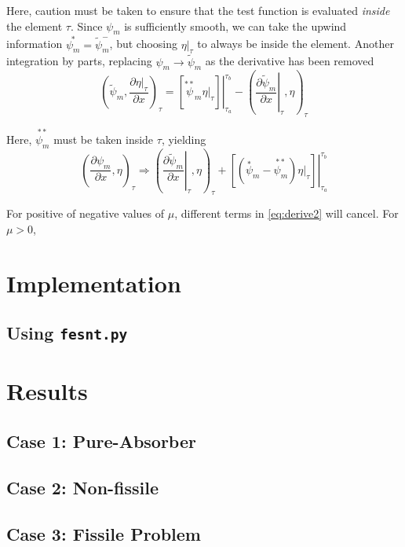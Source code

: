 \documentclass{article}
\newcommand{\pdiff}[2]{\frac{\partial#1}{\partial#2}}
\newcommand{\ddx}[1]{\pdiff{#1}{x}}
\newcommand{\dpmdx}{\ddx{\psi_m}}
\newcommand{\fepsim}{\tilde{\psi}_m}
\newcommand{\innerProd}[2]{\left(#1,#2\right)}
\newcommand{\tauInt}[2]{\innerProd{#1}{#2}_\tau}
\newcommand{\inTau}[1]{\left.#1\right\vert_{\tau}}
\begin{document}
Here, caution must be taken to ensure that the test function is evaluated \textit{inside} the
element $\tau$.
Since $\psi_m$ is sufficiently smooth, we can take the upwind information $\overset{*}{\psi_m}=\fepsim^-$,
but choosing $\inTau{\eta}$ to always be inside the element.
Another integration by parts, replacing $\psi_m\rightarrow\fepsim$ as the derivative has been removed
\begin{equation}
    \label{eq:derive1}
    \tauInt{\fepsim}{\ddx{\inTau{\eta}}}=\left.\left[
        \overset{**}\psi_m\inTau{\eta}
    \right]\right|_{\tau_a}^{\tau_b}
    -\tauInt{\inTau{\ddx{\fepsim}}}{\eta}
\end{equation}

Here, $\overset{**}{\psi_m}$ must be taken inside $\tau$, yielding
\begin{equation}
    \label{eq:derive2}
    \tauInt{\dpmdx}{\eta}\Rightarrow
        \tauInt{\inTau{\ddx{\fepsim}}}{\eta}
        + \left.\left[\left(\overset{*}\psi_m-\overset{**}{\psi_m}\right)\inTau{\eta}\right]
        \right\vert_{\tau_a}^{\tau_b}
\end{equation}

For positive of negative values of $\mu$, different terms in \cref{eq:derive2} will cancel.
For $\mu>0$,

\section{Implementation} \label{sec:implement}

\subsection{Using \texttt{fesnt.py}} \label{sec:usage}

\section{Results} \label{sec:results}

\subsection{Case 1: Pure-Absorber} \label{sec:pa}

\subsection{Case 2: Non-fissile} \label{sec:nonFissile}

\subsection{Case 3: Fissile Problem} \label{sec:fissile}
\end{document}
